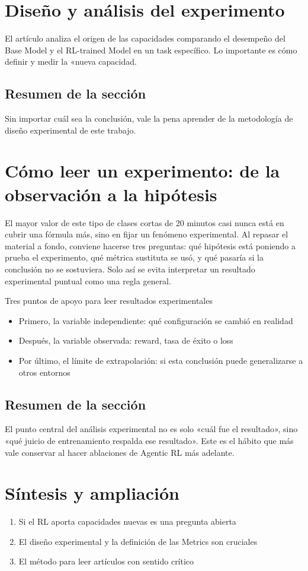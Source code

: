\documentclass[a4paper]{article}
\begin{document}
\section{Diseño y análisis del experimento}
El artículo analiza el origen de las capacidades comparando el desempeño del Base Model y el RL-trained Model en un task específico. Lo importante es cómo definir y medir la «nueva capacidad.

\subsection{Resumen de la sección}
Sin importar cuál sea la conclusión, vale la pena aprender de la metodología de diseño experimental de este trabajo.

\newpage
\section{Cómo leer un experimento: de la observación a la hipótesis}
El mayor valor de este tipo de clases cortas de 20 minutos casi nunca está en cubrir una fórmula más, sino en fijar un fenómeno experimental. Al repasar el material a fondo, conviene hacerse tres preguntas: qué hipótesis está poniendo a prueba el experimento, qué métrica sustituta se usó, y qué pasaría si la conclusión no se sostuviera. Solo así se evita interpretar un resultado experimental puntual como una regla general.

\begin{knowledgebox}{Tres puntos de apoyo para leer resultados experimentales}
\begin{itemize}
  \item Primero, la variable independiente: qué configuración se cambió en realidad
  \item Después, la variable observada: reward, tasa de éxito o loss
  \item Por último, el límite de extrapolación: si esta conclusión puede generalizarse a otros entornos
\end{itemize}
\end{knowledgebox}

\subsection{Resumen de la sección}
El punto central del análisis experimental no es solo «cuál fue el resultado», sino «qué juicio de entrenamiento respalda ese resultado». Este es el hábito que más vale conservar al hacer ablaciones de Agentic RL más adelante.

\newpage
\section{Síntesis y ampliación}
\begin{enumerate}
  \item Si el RL aporta capacidades nuevas es una pregunta abierta
  \item El diseño experimental y la definición de las Metrics son cruciales
  \item El método para leer artículos con sentido crítico
\end{enumerate}
\end{document}
